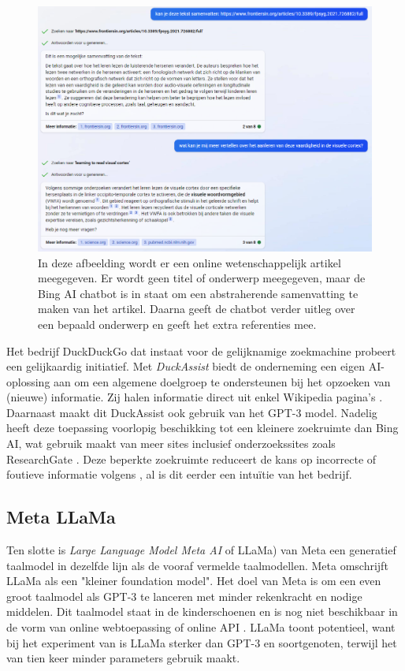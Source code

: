 \begin{figure}[H]
	\includegraphics{img/bing-ai-chatbot-example.png}
	\caption{In deze afbeelding wordt er een online wetenschappelijk artikel meegegeven. Er wordt geen titel of onderwerp meegegeven, maar de Bing AI chatbot is in staat om een abstraherende samenvatting te maken van het artikel. Daarna geeft de chatbot verder uitleg over een bepaald onderwerp en geeft het extra referenties mee.}
\end{figure}


Het bedrijf DuckDuckGo dat instaat voor de gelijknamige zoekmachine probeert een gelijkaardig initiatief. Met \textit{DuckAssist} biedt de onderneming een eigen AI-oplossing aan om een algemene doelgroep te ondersteunen bij het opzoeken van (nieuwe) informatie. Zij halen informatie direct uit enkel Wikipedia pagina's \autocite{Weinberg2023}. Daarnaast maakt dit DuckAssist ook gebruik van het GPT-3 model. Nadelig heeft deze toepassing voorlopig beschikking tot een kleinere zoekruimte dan Bing AI, wat gebruik maakt van meer sites inclusief onderzoekssites zoals ResearchGate \autocite{Mcauliffe2023}. Deze beperkte zoekruimte reduceert de kans op incorrecte of foutieve informatie volgens \textcite{Weinberg2023}, al is dit eerder een intuïtie van het bedrijf.


\subsection{Meta LLaMa}

Ten slotte is \textit{\textit{Large Language Model Meta AI}} of LLaMa) van Meta een generatief taalmodel in dezelfde lijn als de vooraf vermelde taalmodellen. Meta omschrijft LLaMa als een "kleiner foundation model". Het doel van Meta is om een even groot taalmodel als GPT-3 te lanceren met minder rekenkracht en nodige middelen. Dit taalmodel staat in de kinderschoenen en is nog niet beschikbaar in de vorm van online webtoepassing of online API \autocite{Hern2023, Touvron2023}. LLaMa toont potentieel, want bij het experiment van \textcite{Touvron2023} is LLaMa sterker dan GPT-3 en soortgenoten, terwijl het van tien keer minder parameters gebruik maakt.

